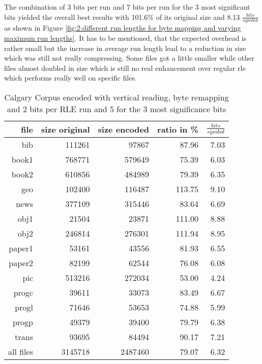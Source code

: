 \par{
The combination of 3 bits per run and 7 bits per run for the 3 most significant bits yielded the overall best results with 101.6\% of its original size and 8.13 $\frac{bits}{symbol}$ as shown in Figure \ref{fig:2:different run lengths for byte mapping and varying maximum run lengths}. It has to be mentioned, that the expected overhead is rather small but the increase in average run length lead to a reduction in size which was still not really compressing. Some files got a little smaller while other files almost doubled in size which is still no real enhancement over regular rle which performs really well on specific files.
\begin{table}[H]
	\centering
	\begin{tabular}{r|r|r|r|r}	
		file & size original & size encoded & ratio in \% & $\frac{bits}{symbol}$\\
		\hline
		bib & 111261 & 97867 & 87.96 & 7.03\\
		book1 & 768771 & 579649 & 75.39 & 6.03 \\
		book2 & 610856 & 484989 & 79.39 & 6.35\\
		geo & 102400 & 116487 & 113.75 & 9.10\\
		news & 377109 & 315446 & 83.64 & 6.69\\
		obj1 & 21504 & 23871 & 111.00 & 8.88\\
		obj2& 246814 & 276301 & 111.94 & 8.95\\		 
		paper1 & 53161 & 43556 & 81.93 & 6.55\\		 
		paper2& 82199 & 62544 & 76.08 & 6.08\\		 
		pic & 513216 & 272034 & 53.00 & 4.24\\		 
		progc & 39611 & 33073 & 83.49 & 6.67\\		 
		progl & 71646 & 53653 & 74.88 & 5.99\\		 
		progp & 49379 & 39400 & 79.79 & 6.38\\		 
		trans & 93695 & 84494 & 90.17 & 7.21\\
		\hline
		all files & 3145718 & 2487460 & 79.07 & 6.32
	\end{tabular}
	\caption{Calgary Corpus encoded with vertical reading, byte remapping and 2 bits per RLE run and 5 for the 3 most significance bits}
\label{tab:t43 Calgary Corpus encoded with vertical reading, byte remapping and 2 bits per RLE run and 5 for the 3 most significance bits}
\end{table}

}
